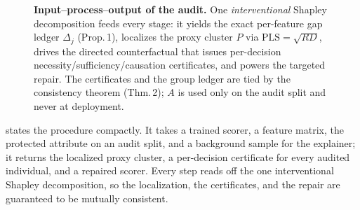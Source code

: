 \documentclass[sn-mathphys-num]{sn-jnl}
\newcommand{\PLS}{\mathrm{PLS}}
\begin{document}
\begin{figure}[tbp]
{}
\caption{\textbf{Input--process--output of the audit.} One \emph{interventional}
Shapley decomposition feeds every stage: it yields the exact per-feature gap
ledger $\Delta_j$ (Prop.\,1), localizes the proxy cluster $P$ via
$\PLS=\sqrt{RD}$, drives the directed counterfactual that issues per-decision
necessity/sufficiency/causation certificates, and powers the targeted repair. The
certificates and the group ledger are tied by the consistency theorem (Thm.\,2);
$A$ is used only on the audit split and never at deployment.}
\label{fig:pipeline}
\end{figure}

 states the procedure compactly. It takes a trained scorer,
a feature matrix, the protected attribute on an audit split, and a background
sample for the explainer; it returns the localized proxy cluster, a per-decision
certificate for every audited individual, and a repaired scorer. Every step reads
off the one interventional Shapley decomposition, so the localization, the
certificates, and the repair are guaranteed to be mutually consistent.
\end{document}
